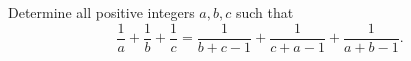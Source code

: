 Determine all positive integers $a,b,c$ such that
\[\dfrac1a+\dfrac1b+\dfrac1c=\dfrac{1}{b+c-1}+\dfrac{1}{c+a-1}+\dfrac{1}{a+b-1}.\]
